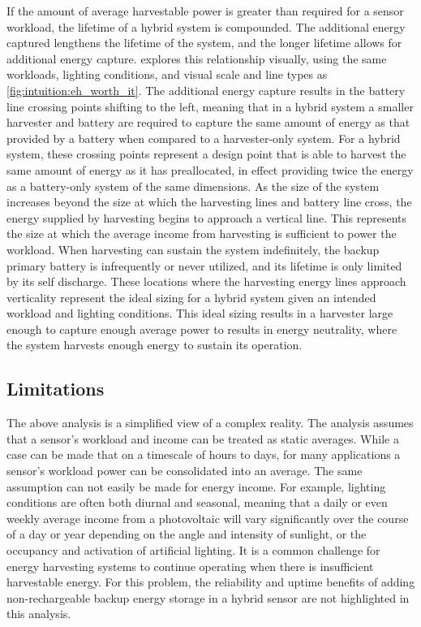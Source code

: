 If the amount of average harvestable power is greater than required for a sensor workload, the lifetime of a hybrid system is compounded. 
The additional energy captured lengthens the lifetime of the system, and the longer lifetime allows for additional energy capture. 
 explores this relationship visually, using the same workloads, lighting conditions, and visual scale and line types as \cref{fig:intuition:eh_worth_it}. The additional energy capture results in the battery line crossing points shifting to the left, meaning that in a hybrid system a smaller harvester and battery are required to capture the same amount of energy as that provided by a battery when compared to a harvester-only system.
For a hybrid system, these crossing points represent a design point that is able to harvest the same amount of energy as it has preallocated, in effect providing twice the energy as a battery-only system of the same dimensions.
As the size of the system increases beyond the size at which the harvesting lines and battery line cross, the energy supplied by harvesting begins to approach a vertical line. 
This represents the size at which the average income from harvesting is sufficient to power the workload. 
When harvesting can sustain the system indefinitely, the backup primary battery is infrequently or never utilized, and its lifetime is only limited by its self discharge.
These locations where the harvesting energy lines approach verticality represent the ideal sizing for a hybrid system given an intended workload and lighting conditions.
This ideal sizing results in a harvester large enough to capture enough average power to results in energy neutrality, where the system harvests enough energy to sustain its operation.

\subsection{Limitations}

The above analysis is a simplified view of a complex reality.
The analysis assumes that a sensor's workload and income can be treated as static averages.
While a case can be made that on a timescale of hours to days, for many applications a sensor's workload power can be consolidated into an average. 
The same assumption can not easily be made for energy income.
For example, lighting conditions are often both diurnal and seasonal, meaning that a daily or even weekly average income from a photovoltaic will vary significantly over the course of a day or year depending on the angle and intensity of sunlight, or the occupancy and activation of artificial lighting.
It is a common challenge for energy harvesting systems to continue operating when there is insufficient harvestable energy.
For this problem, the reliability and uptime benefits of adding non-rechargeable backup energy storage in a hybrid sensor are not highlighted in this analysis.

